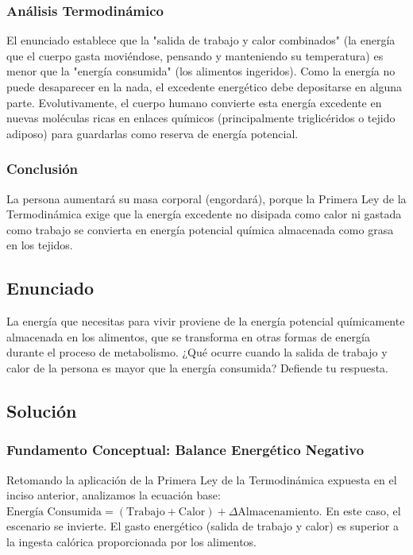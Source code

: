 \documentclass[12pt,a4paper]{article}
\begin{document}
\subsubsection*{Análisis Termodinámico}
El enunciado establece que la "salida de trabajo y calor combinados" (la energía que el cuerpo gasta moviéndose, pensando y manteniendo su temperatura) es menor que la "energía consumida" (los alimentos ingeridos). Como la energía no puede desaparecer en la nada, el excedente energético debe depositarse en alguna parte. Evolutivamente, el cuerpo humano convierte esta energía excedente en nuevas moléculas ricas en enlaces químicos (principalmente triglicéridos o tejido adiposo) para guardarlas como reserva de energía potencial.

\subsubsection*{Conclusión}
La persona aumentará su masa corporal (engordará), porque la Primera Ley de la Termodinámica exige que la energía excedente no disipada como calor ni gastada como trabajo se convierta en energía potencial química almacenada como grasa en los tejidos.

\newpage
\subsection*{Enunciado}
La energía que necesitas para vivir proviene de la energía potencial químicamente almacenada en los alimentos, que se transforma en otras formas de energía durante el proceso de metabolismo. ¿Qué ocurre cuando la salida de trabajo y calor de la persona es mayor que la energía consumida? Defiende tu respuesta.

\subsection*{Solución}

\subsubsection*{Fundamento Conceptual: Balance Energético Negativo}
Retomando la aplicación de la Primera Ley de la Termodinámica expuesta en el inciso anterior, analizamos la ecuación base: $\text{Energía Consumida} = (\text{Trabajo} + \text{Calor}) + \Delta\text{Almacenamiento}$. En este caso, el escenario se invierte. El gasto energético (salida de trabajo y calor) es superior a la ingesta calórica proporcionada por los alimentos.
\end{document}

